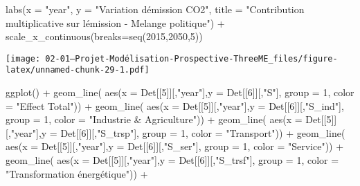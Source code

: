 \documentclass[
]{article}
\newenvironment{Shaded}{\begin{snugshade}}{\end{snugshade}}
\newcommand{\AttributeTok}[1]{\textcolor[rgb]{0.77,0.63,0.00}{#1}}
\newcommand{\DecValTok}[1]{\textcolor[rgb]{0.00,0.00,0.81}{#1}}
\newcommand{\FunctionTok}[1]{\textcolor[rgb]{0.00,0.00,0.00}{#1}}
\newcommand{\NormalTok}[1]{#1}
\newcommand{\SpecialCharTok}[1]{\textcolor[rgb]{0.00,0.00,0.00}{#1}}
\newcommand{\StringTok}[1]{\textcolor[rgb]{0.31,0.60,0.02}{#1}}
\begin{document}
\begin{Shaded}
\begin{Highlighting}[]
  \FunctionTok{labs}\NormalTok{(}\AttributeTok{x =} \StringTok{"year"}\NormalTok{, }\AttributeTok{y =} \StringTok{"Variation d\textquotesingle{}émission CO2"}\NormalTok{, }\AttributeTok{title =} \StringTok{"Contribution multiplicative sur l\textquotesingle{}émission {-} Melange politique"}\NormalTok{) }\SpecialCharTok{+}
  \FunctionTok{scale\_x\_continuous}\NormalTok{(}\AttributeTok{breaks=}\FunctionTok{seq}\NormalTok{(}\DecValTok{2015}\NormalTok{,}\DecValTok{2050}\NormalTok{,}\DecValTok{5}\NormalTok{))}
\end{Highlighting}
\end{Shaded}

\texttt{[image: 02-01---Projet-Modélisation-Prospective-ThreeME\_files/figure-latex/unnamed-chunk-29-1.pdf]}

\begin{Shaded}
\begin{Highlighting}[]
\FunctionTok{ggplot}\NormalTok{() }\SpecialCharTok{+} 
  \FunctionTok{geom\_line}\NormalTok{( }\FunctionTok{aes}\NormalTok{(}\AttributeTok{x =}\NormalTok{ Det[[}\DecValTok{5}\NormalTok{]][,}\StringTok{"year"}\NormalTok{],}\AttributeTok{y =}\NormalTok{ Det[[}\DecValTok{6}\NormalTok{]][,}\StringTok{"S"}\NormalTok{], }\AttributeTok{group =} \DecValTok{1}\NormalTok{, }\AttributeTok{color =} \StringTok{"Effect Total"}\NormalTok{)) }\SpecialCharTok{+} 
  \FunctionTok{geom\_line}\NormalTok{( }\FunctionTok{aes}\NormalTok{(}\AttributeTok{x =}\NormalTok{ Det[[}\DecValTok{5}\NormalTok{]][,}\StringTok{"year"}\NormalTok{],}\AttributeTok{y =}\NormalTok{ Det[[}\DecValTok{6}\NormalTok{]][,}\StringTok{"S\_ind"}\NormalTok{], }\AttributeTok{group =} \DecValTok{1}\NormalTok{, }\AttributeTok{color =} \StringTok{"Industrie \& Agriculture"}\NormalTok{)) }\SpecialCharTok{+} 
  \FunctionTok{geom\_line}\NormalTok{( }\FunctionTok{aes}\NormalTok{(}\AttributeTok{x =}\NormalTok{ Det[[}\DecValTok{5}\NormalTok{]][,}\StringTok{"year"}\NormalTok{],}\AttributeTok{y =}\NormalTok{ Det[[}\DecValTok{6}\NormalTok{]][,}\StringTok{"S\_trsp"}\NormalTok{], }\AttributeTok{group =} \DecValTok{1}\NormalTok{, }\AttributeTok{color =} \StringTok{"Transport"}\NormalTok{)) }\SpecialCharTok{+} 
  \FunctionTok{geom\_line}\NormalTok{( }\FunctionTok{aes}\NormalTok{(}\AttributeTok{x =}\NormalTok{ Det[[}\DecValTok{5}\NormalTok{]][,}\StringTok{"year"}\NormalTok{],}\AttributeTok{y =}\NormalTok{ Det[[}\DecValTok{6}\NormalTok{]][,}\StringTok{"S\_ser"}\NormalTok{], }\AttributeTok{group =} \DecValTok{1}\NormalTok{, }\AttributeTok{color =} \StringTok{"Service"}\NormalTok{)) }\SpecialCharTok{+} 
  \FunctionTok{geom\_line}\NormalTok{( }\FunctionTok{aes}\NormalTok{(}\AttributeTok{x =}\NormalTok{ Det[[}\DecValTok{5}\NormalTok{]][,}\StringTok{"year"}\NormalTok{],}\AttributeTok{y =}\NormalTok{ Det[[}\DecValTok{6}\NormalTok{]][,}\StringTok{"S\_trsf"}\NormalTok{], }\AttributeTok{group =} \DecValTok{1}\NormalTok{, }\AttributeTok{color =} \StringTok{"Transformation énergétique"}\NormalTok{)) }\SpecialCharTok{+} 

\end{Highlighting}
\end{Shaded}
\end{document}

